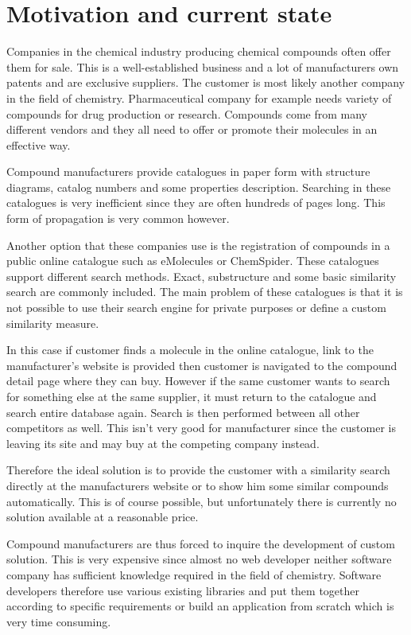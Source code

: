 \documentclass[thesis=M,english]{FITthesis}[2012/10/20]
\begin{document}
\section{Motivation and current state}
Companies in the chemical industry producing chemical compounds often offer them for sale. This is a well-established business and a lot of manufacturers own patents and are exclusive suppliers. The customer is most likely another company in the field of chemistry. Pharmaceutical company for example needs variety of compounds for drug production or research. Compounds come from many different vendors and they all need to offer or promote their molecules in an effective way.

Compound manufacturers provide catalogues in paper form with structure diagrams, catalog numbers and some properties description. Searching in these catalogues is very inefficient since they are often hundreds of pages long. This form of propagation is very common however.

Another option that these companies use is the registration of compounds in a public online catalogue such as eMolecules or ChemSpider. These catalogues support different search methods. Exact, substructure and some basic similarity search are commonly included. The main problem of these catalogues is that it is not possible to use their search engine for private purposes or define a custom similarity measure.

In this case if customer finds a molecule in the online catalogue, link to the manufacturer's website is provided then customer is navigated to the compound detail page where they can buy. However if the same customer wants to search for something else at the same supplier, it must return to the catalogue and search entire database again. Search is then performed between all other competitors as well. This isn’t very good for manufacturer since the customer is leaving its site and may buy at the competing company instead.

Therefore the ideal solution is to provide the customer with a similarity search directly at the manufacturers website or to show him some similar compounds automatically. This is of course possible, but unfortunately there is currently no solution available at a reasonable price. 

Compound manufacturers are thus forced to inquire the development of custom solution. This is very expensive since almost no web developer neither software company has sufficient knowledge required in the field of chemistry. Software developers therefore use various existing libraries and put them together according to specific requirements or build an application from scratch which is very time consuming.
\end{document}

